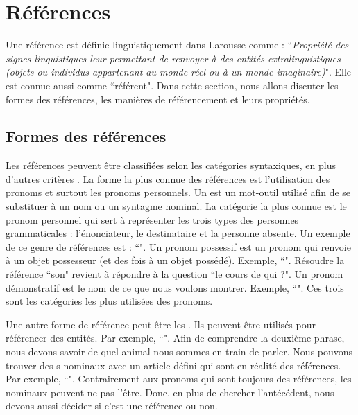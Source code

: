\documentclass{KodeBook}
\begin{document}
\section{Références}

Une référence est définie linguistiquement dans Larousse comme : ``\textit{Propriété des signes linguistiques leur permettant de renvoyer à des entités extralinguistiques (objets ou individus appartenant au monde réel ou à un monde imaginaire)}". 
Elle est connue aussi comme ``référent".
Dans cette section, nous allons discuter les formes des références, les manières de référencement et leurs propriétés.

\subsection{Formes des références}

Les références peuvent être classifiées selon les catégories syntaxiques, en plus d'autres critères \cite{2015-schmolz}.
La forme la plus connue des références est l'utilisation des pronoms et surtout les pronoms personnels.
Un  est un mot-outil utilisé afin de se substituer à un nom ou un syntagme nominal. 
La catégorie la plus connue est le pronom personnel qui sert à représenter les trois types des personnes grammaticales : l'énonciateur, le destinataire et la personne absente. 
Un exemple de ce genre de références est :  ``".
Un pronom possessif est un pronom qui renvoie à un objet possesseur (et des fois à un objet possédé).
Exemple, ``".
Résoudre la référence ``son" revient à répondre à la question ``le cours de qui ?". 
Un pronom démonstratif est le nom de ce que nous voulons montrer.
Exemple, ``". 
Ces trois sont les catégories les plus utilisées des pronoms.

Une autre forme de référence peut être les .
Ils peuvent être utilisés pour référencer des entités.
Par exemple, ``".
Afin de comprendre la deuxième phrase, nous devons savoir de quel animal nous sommes en train de parler. 
Nous pouvons trouver des s nominaux avec un article défini qui sont en réalité des références. 
Par exemple, ``".
Contrairement aux pronoms qui sont toujours des références, les  nominaux peuvent ne pas l'être. 
Donc, en plus de chercher l'antécédent, nous devons aussi décider si c'est une référence ou non.
\end{document}
